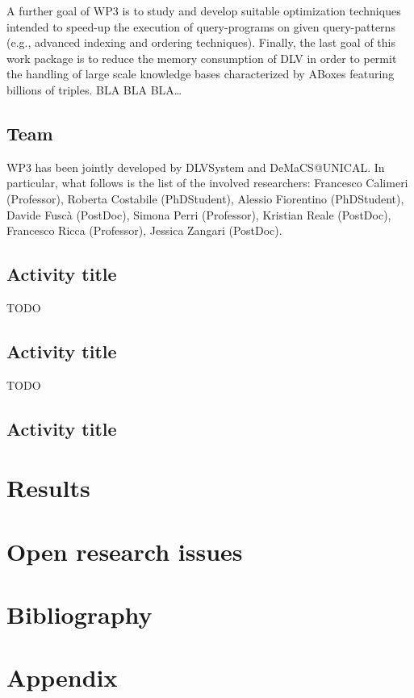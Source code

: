 \documentclass[oneside]{book}
\begin{document}
A further goal of WP3 is to study and develop suitable optimization techniques intended to speed-up the execution of query-programs on given query-patterns (e.g., advanced indexing and ordering techniques). Finally, the last goal of this work package is to reduce the memory consumption of DLV in order to permit the handling of large scale knowledge bases characterized by ABoxes featuring billions of triples.
BLA BLA BLA… 



\section{Team}
WP3 has been jointly developed by DLVSystem and DeMaCS@UNICAL. In particular, what follows is the list of the involved researchers: Francesco Calimeri (Professor), Roberta Costabile (PhDStudent), Alessio Fiorentino (PhDStudent), Davide Fuscà (PostDoc), Simona Perri (Professor), Kristian Reale (PostDoc), Francesco Ricca (Professor), Jessica Zangari (PostDoc).

\section{Activity title}
TODO
\section{Activity title}
TODO
\section{Activity title}


\chapter{Results}
\chapter{Open research issues}
\chapter{Bibliography}
\chapter{Appendix}

\setcounter{chapter}{0}
\end{document}
